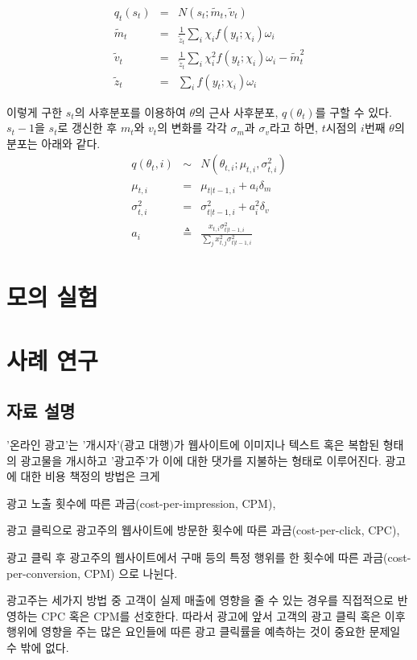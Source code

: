 \documentclass[oneside,b5paper,11pt]{book} %
\begin{document}
\begin{eqnarray}
q_t(s_t) &=& N(s_t; \tilde{m}_t, \tilde{v}_t)
\\ \tilde{m}_t &=& \frac{1}{\tilde{z}_t} \sum_i \chi_i f(y_t; \chi_i ) \omega_i
\\ \tilde{v}_t &=& \frac{1}{\tilde{z}_t} \sum_i \chi^2_i f(y_t; \chi_i ) \omega_i - \tilde{m}^2_t
\\ \tilde{z}_t &=& \sum_i f(y_t; \chi_i ) \omega_i
\end{eqnarray}

이렇게 구한 $s_t$의 사후분포를 이용하여 $\theta$의 근사 사후분포,  $q(\theta_t)$를 구할 수 있다. $s_t-1$을 $s_t$로 갱신한 후 $m_t$와 $v_t$의 변화를 각각 $\sigma_m$과 $\sigma_v$라고 하면, $t$시점의 $i$번째 $\theta$의 분포는 아래와 같다.\citep{Murphy2012}
\begin{eqnarray}
   q(\theta_t,i) &\sim& N(\theta_{t,i};\mu_{t,i}, \sigma^2_{t,i})
\\ \mu_{t,i} &=& \mu_{t|t-1,i} + a_i \delta_m
\\ \sigma^2_{t,i} &=& \sigma^2_{t|t-1,i} + a^2_i \delta_v
\\ a_i &\triangleq& \frac{x_{t,i}\sigma^2_{t|t-1,i}}{\sum_j x^2_{t,j}\sigma^2_{t|t-1,i}}
\end{eqnarray}



%
%
\chapter{모의 실험}


%
%
\chapter{사례 연구}

\section{자료 설명}
 '온라인 광고'는 '개시자'(광고 대행)가 웹사이트에 이미지나 텍스트 혹은 복합된 형태의 광고물을 개시하고 '광고주'가 이에 대한 댓가를 지불하는 형태로 이루어진다. 광고에 대한 비용 책정의 방법은 크게
 \begin{inparaenum}[i)]
 \item 광고 노출 횟수에 따른 과금(cost-per-impression, CPM),
 \item 광고 클릭으로 광고주의 웹사이트에 방문한 횟수에 따른 과금(cost-per-click, CPC),
 \item 광고 클릭 후 광고주의 웹사이트에서 구매 등의 특정 행위를 한 횟수에 따른 과금(cost-per-conversion, CPM) 으로 나뉜다.
 \end{inparaenum}
 광고주는 세가지 방법 중 고객이 실제 매출에 영향을 줄 수 있는 경우를 직접적으로 반영하는 CPC 혹은 CPM를 선호한다. 따라서 광고에 앞서 고객의 광고 클릭 혹은 이후 행위에 영향을 주는 많은 요인들에 따른 광고 클릭률을 예측하는 것이 중요한 문제일 수 밖에 없다.\citep{Chapelle2013}
 
\end{document}
